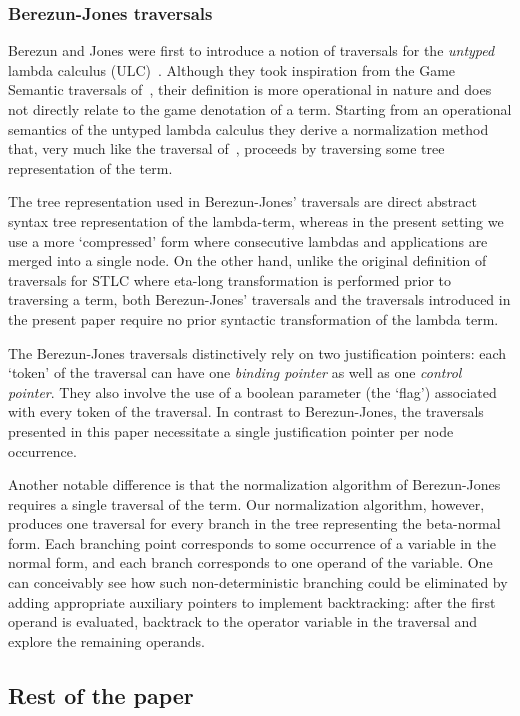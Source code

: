 \documentclass{article}
\theoremstyle{plain}
\theoremstyle{definition}
\theoremstyle{remark}
\begin{document}
\subsubsection{Berezun-Jones traversals}
Berezun and Jones were first to introduce a notion of traversals for the \emph{untyped} lambda calculus (ULC)~\cite{JonesBerezunLLL}. Although they took inspiration from the Game Semantic traversals of~\cite{Ong2006,BlumGalop2008}, their definition is more operational in nature and does not directly relate to the game denotation of a term. Starting from an operational semantics of the untyped lambda calculus they derive a normalization method that, very much like the traversal of~\cite{Ong2006, BlumPhd}, proceeds by traversing some tree representation of the term.

The tree representation used in Berezun-Jones' traversals are direct abstract syntax tree representation of the lambda-term, whereas in the present setting we use a more `compressed' form where consecutive lambdas and applications are merged into a single node. On the other hand, unlike the original definition of traversals for STLC where eta-long transformation is performed prior to traversing a term, both Berezun-Jones' traversals and the traversals introduced in the present paper require no prior syntactic transformation of the lambda term.

The Berezun-Jones traversals distinctively rely on two justification pointers: each `token' of the traversal can have one \emph{binding pointer} as well as one \emph{control pointer}. They also involve the use of a boolean parameter (the `flag') associated with every token of the traversal. In contrast to Berezun-Jones, the traversals presented in this paper necessitate a single justification pointer per node occurrence.

Another notable difference is that the normalization algorithm of Berezun-Jones requires a single traversal of the term. Our normalization algorithm, however, produces one traversal for every branch in the tree representing the beta-normal form. Each branching point corresponds to some occurrence of a variable in the normal form, and each branch corresponds to one operand of the variable. One can conceivably see how such non-deterministic branching could be eliminated by adding appropriate auxiliary pointers to implement backtracking: after the first operand is evaluated, backtrack to the operator variable in the traversal and explore the remaining operands.

\subsection{Rest of the paper}
\end{document}
